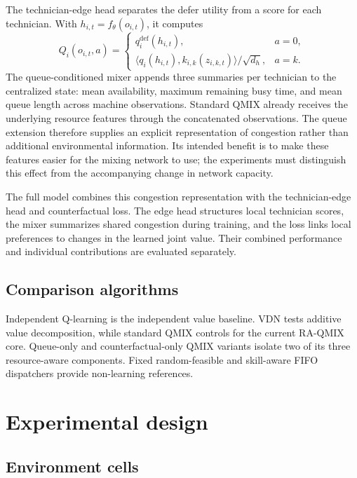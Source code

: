 \documentclass[11pt]{article}
\begin{document}
The technician-edge head separates the defer utility from a score for each technician. With $h_{i,t}=f_\theta(o_{i,t})$, it computes
\begin{equation}
Q_i(o_{i,t},a)=
\begin{cases}
q_i^{\mathrm{def}}(h_{i,t}), & a=0,\\
\langle q_i(h_{i,t}),k_{i,k}(z_{i,k,t})\rangle/\sqrt{d_h}, & a=k.
\end{cases}
\end{equation}
The queue-conditioned mixer appends three summaries per technician to the centralized state: mean availability, maximum remaining busy time, and mean queue length across machine observations. Standard QMIX already receives the underlying resource features through the concatenated observations. The queue extension therefore supplies an explicit representation of congestion rather than additional environmental information. Its intended benefit is to make these features easier for the mixing network to use; the experiments must distinguish this effect from the accompanying change in network capacity.

The full model combines this congestion representation with the technician-edge head and counterfactual loss. The edge head structures local technician scores, the mixer summarizes shared congestion during training, and the loss links local preferences to changes in the learned joint value. Their combined performance and individual contributions are evaluated separately.

\subsection{Comparison algorithms}

Independent Q-learning is the independent value baseline. VDN tests additive value decomposition, while standard QMIX controls for the current RA-QMIX core. Queue-only and counterfactual-only QMIX variants isolate two of its three resource-aware components. Fixed random-feasible and skill-aware FIFO dispatchers provide non-learning references.

\section{Experimental design}

\subsection{Environment cells}
\end{document}
